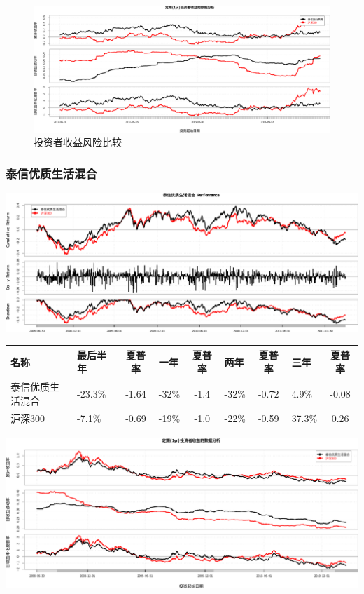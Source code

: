 \documentclass[hyperref,]{ctexart}
\begin{document}
\begin{figure}[htbp]
\centering
\includegraphics{zzq-detail_files/figure-latex/unnamed-chunk-7-1.pdf}
\caption{投资者收益风险比较}
\end{figure}

\subsubsection{泰信优质生活混合}

\includegraphics{zzq-detail_files/figure-latex/unnamed-chunk-8-1.pdf}

\begin{longtable}[]{@{}llclclclc@{}}
\toprule
名称 & 最后半年 & 夏普率 & 一年 & 夏普率 & 两年 & 夏普率 & 三年 &
夏普率\tabularnewline
\midrule
\endhead
泰信优质生活混合 & -23.3\% & -1.64 & -32\% & -1.4 & -32\% & -0.72 &
4.9\% & -0.08\tabularnewline
沪深300 & -7.1\% & -0.69 & -19\% & -1.0 & -22\% & -0.59 & 37.3\% &
0.26\tabularnewline
\bottomrule
\end{longtable}

\includegraphics{zzq-detail_files/figure-latex/unnamed-chunk-8-2.pdf}
\end{document}
